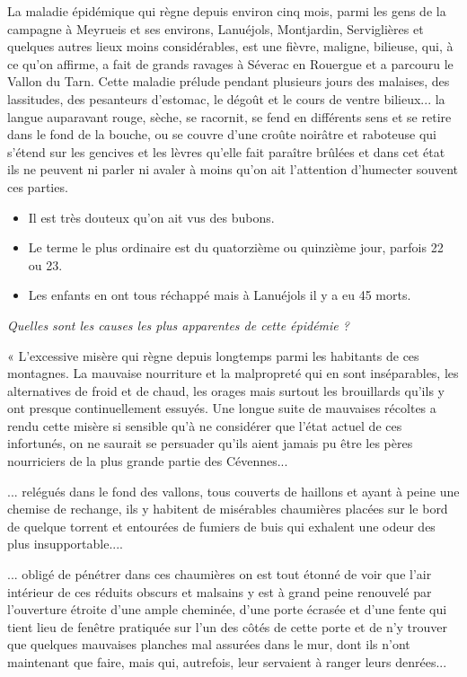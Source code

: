 {\fontsize{10.25}{12.1}\selectfont
La maladie épidémique qui règne depuis environ cinq mois, parmi les gens de la campagne à Meyrueis et ses environs, Lanuéjols, Montjardin, Serviglières et quelques autres lieux moins considérables, est une fièvre, maligne, bilieuse, qui, à ce qu’on affirme, a fait de grands ravages à Séverac en Rouergue et a parcouru le Vallon du Tarn. Cette maladie prélude pendant plusieurs jours des malaises, des lassitudes, des pesanteurs d’estomac, le dégoût et le cours de ventre bilieux... la langue auparavant rouge, sèche, se racornit, se fend en différents sens et se retire dans le fond de la bouche, ou se couvre d’une croûte noirâtre et raboteuse qui s’étend sur les gencives et les lèvres qu’elle fait paraître brûlées et dans cet état ils ne peuvent ni parler ni avaler à moins qu’on ait l’attention d’humecter souvent ces parties.

\begin{itemize}
\item Il est très douteux qu’on ait vus des bubons.
\item Le terme le plus ordinaire est du quatorzième ou quinzième jour, parfois 22 ou 23.
\item Les enfants en ont tous réchappé mais à Lanuéjols il y a eu 45 morts.
\end{itemize}

\medskip
\textit{Quelles sont les causes les plus apparentes de cette épidémie ?}


« L’excessive misère qui règne depuis longtemps parmi les habitants de ces montagnes. La mauvaise nourriture et la malpropreté qui en sont inséparables, les alternatives de froid et de chaud, les orages mais surtout les brouillards qu’ils y ont presque continuellement essuyés. Une longue suite de mauvaises récoltes a rendu cette misère si sensible qu’à ne considérer que l’état actuel de ces infortunés, on ne saurait se persuader qu’ils aient jamais pu être les pères nourriciers de la plus grande partie des Cévennes...

... relégués dans le fond des vallons, tous couverts de haillons et ayant à peine une chemise de rechange, ils y habitent de misérables chaumières placées sur le bord de quelque torrent et entourées de fumiers de buis qui exhalent une odeur des plus insupportable....

... obligé de pénétrer dans ces chaumières on est tout étonné de voir que l’air intérieur de ces réduits obscurs et malsains y est à grand peine renouvelé par l’ouverture étroite d’une ample cheminée, d’une porte écrasée et d’une fente qui tient lieu de fenêtre pratiquée sur l’un des côtés de cette porte et de n’y trouver que quelques mauvaises planches mal assurées dans le mur, dont ils n’ont maintenant que faire, mais qui, autrefois, leur servaient à ranger leurs denrées...

}

